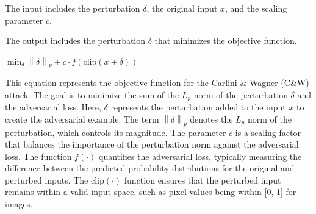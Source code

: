 
The input includes the perturbation $\delta$, the original input $x$, and the scaling parameter $c$.

The output includes the perturbation $\delta$ that minimizes the objective function.

$\min_{\delta} \left\| \delta \right\|_p + c \cdot f(\text{clip}(x + \delta))$

This equation represents the objective function for the Carlini \& Wagner (C\&W) attack. The goal is to minimize the sum of the $L_p$ norm of the perturbation $\delta$ and the adversarial loss. Here, $\delta$ represents the perturbation added to the input $x$ to create the adversarial example. The term $\left\| \delta \right\|_p$ denotes the $L_p$ norm of the perturbation, which controls its magnitude. The parameter $c$ is a scaling factor that balances the importance of the perturbation norm against the adversarial loss. The function $f(\cdot)$ quantifies the adversarial loss, typically measuring the difference between the predicted probability distributions for the original and perturbed inputs. The $\text{clip}(\cdot)$ function ensures that the perturbed input remains within a valid input space, such as pixel values being within [0, 1] for images.